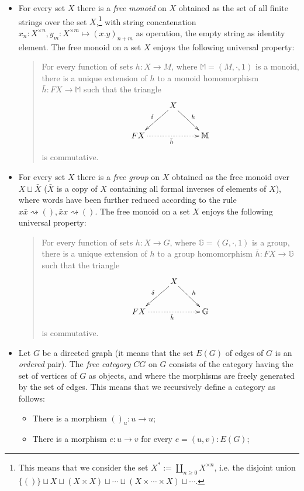 \documentclass[11pt]{article}
\begin{document}
\begin{itemize}
	\item For every set $X$ there is a \emph{free monoid} on $X$ obtained as the set of all finite strings over the set $X$,\footnote{This means that we consider the set $X^* := \coprod_{n \ge 0}X^{\times n}$, i.e. the disjoint union $\{()\}\sqcup X \sqcup (X\times X)\sqcup \cdots\sqcup (X\times\cdots \times X) \sqcup\cdots$.} with string concatenation $x_n  :  X^{\times n}, y_m : X^{\times m} \mapsto (x.y)_{n+m}$ as operation, the empty string as identity element. The free monoid on a set $X$ enjoys the following universal property:
	\begin{quote}
		For every function of sets $h : X \to M$, where $\mathbb M = (M,\cdot,1)$ is a monoid, there is a unique extension of $h$ to a monoid homomorphism $\bar h : FX \to \mathbb M$ such that the triangle
	\[\vcenter{\xymatrix{
	&X\ar[dr]^h\ar[dl]_\delta &\\
	FX \ar@{.>}[rr]_{\bar h}&& \mathbb M
	}}\]
	is commutative.
	\end{quote}
	\item For every set $X$ there is a \emph{free group} on $X$ obtained as the free monoid over $X\sqcup \bar X$ ($\bar X$ is a copy of $X$ containing all formal inverses of elements of $X$), where words have been further reduced according to the rule $x\bar x \rightsquigarrow (), \bar xx \rightsquigarrow ()$. The free monoid on a set $X$ enjoys the following universal property:
	\begin{quote}
		For every function of sets $h : X \to G$, where $\mathbb G = (G,\cdot,1)$ is a group, there is a unique extension of $h$ to a group homomorphism $\bar h : FX \to \mathbb G$ such that the triangle
	\[\vcenter{\xymatrix{
	&X\ar[dr]^h\ar[dl]_\delta &\\
	FX \ar@{.>}[rr]_{\bar h}&& \mathbb G
	}}\]
	is commutative.
	\end{quote}
	\item Let $G$ be a directed graph (it means that the set $E(G)$ of edges of $G$ is an \emph{ordered} pair). The \emph{free category} $CG$ on $G$ consists of the category having the set of vertices of $G$ as objects, and where the morphisms are freely generated by the set of edges. This means that we recursively define a category as follows:
	\begin{itemize}
		\item There is a morphism $()_u : u\to u$;
		\item There is a morphism $e : u\to v$ for every $e=(u,v) :  E(G)$;

\end{itemize}
\end{itemize}
\end{document}
